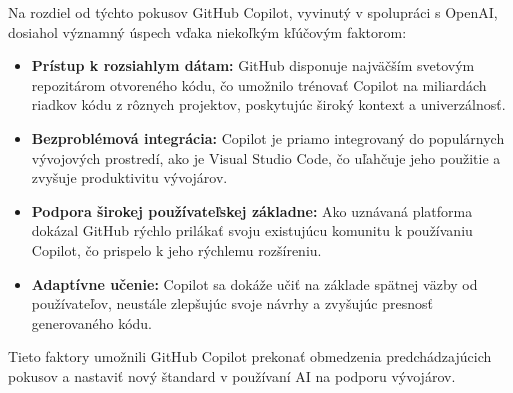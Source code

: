 \documentclass[10pt,oneside,slovak,a4paper, onecolumn]{article}
\begin{document}
Na rozdiel od týchto pokusov GitHub Copilot, vyvinutý v spolupráci s OpenAI, dosiahol významný úspech vďaka niekoľkým kľúčovým faktorom:
\begin{itemize}[itemsep=5pt]
    \item \textbf{Prístup k rozsiahlym dátam:}
     GitHub disponuje najväčším svetovým repozitárom otvoreného kódu, čo umožnilo trénovať Copilot na miliardách riadkov kódu z rôznych projektov, poskytujúc široký kontext a univerzálnosť. \cite{impactofai}
    \item \textbf{Bezproblémová integrácia:}
     Copilot je priamo integrovaný do populárnych vývojových prostredí, ako je Visual Studio Code, čo uľahčuje jeho použitie a zvyšuje produktivitu vývojárov.\cite{docs}
    \item \textbf{Podpora širokej používateľskej základne:}
     Ako uznávaná platforma dokázal GitHub rýchlo prilákať svoju existujúcu komunitu k používaniu Copilot, čo prispelo k jeho rýchlemu rozšíreniu.
    \item \textbf{Adaptívne učenie:}
     Copilot sa dokáže učiť na základe spätnej väzby od používateľov, neustále zlepšujúc svoje návrhy a zvyšujúc presnosť generovaného kódu.\cite{mariorod}
\end{itemize}

Tieto faktory umožnili GitHub Copilot prekonať obmedzenia predchádzajúcich pokusov a nastaviť nový štandard v používaní AI na podporu vývojárov.
\end{document}
